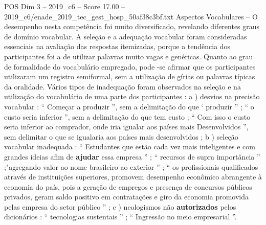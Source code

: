 \begin{textsample}{POS Dim 3 – 2019\_c6 – Score 17.00 – 2019\_c6/enade\_2019\_tec\_gest\_hosp\_50af38c3bf.txt}
Aspectos Vocabulares – O desempenho nesta competência foi muito diversificado, revelando diferentes graus de domínio vocabular.
A seleção e a adequação vocabular foram consideradas essenciais na avaliação das respostas itemizadas, porque a tendência dos participantes foi a de utilizar palavras muito vagas e genéricas.
Quanto ao grau de formalidade do vocabulário empregado, pode -se afirmar que os participantes utilizaram um registro semiformal, sem a utilização de gírias ou palavras típicas da oralidade.
Vários tipos de inadequação foram observados na seleção e na utilização do vocabulário de uma parte dos participantes : a ) desvios na precisão vocabular : “ Começar a produzir ”, sem a delimitação do que ‘ produzir ” ; “ o custo seria inferior ”, sem a delimitação do que tem custo ; “ Com isso o custo seria inferior ao comprador, onde iria igualar aos países mais Desenvolvidos ”, sem delimitar o que se igualaria aos países mais desenvolvidos ; b ) seleção vocabular inadequada : “ Estudantes que estão cada vez mais inteligentes e com grandes ideias afim de \textbf{ajudar} essa empresa ” ; “ recursos de supra importância ” ;"agregando valor ao nome brasileiro ao exterior ” ; “ os profissionais qualificados através de instituições superiores, promovem desempenho econômico abrangente à economia do país, pois a geração de empregos e presença de concursos públicos privados, geram saldo positivo em contratações e giro da economia promovida pelas empresa do setor público ” ; c ) neologismos não \textbf{autorizados} pelos dicionários : “ tecnologias sustentais ” ; “ Ingressão no meio empresarial ”.

\end{textsample}
